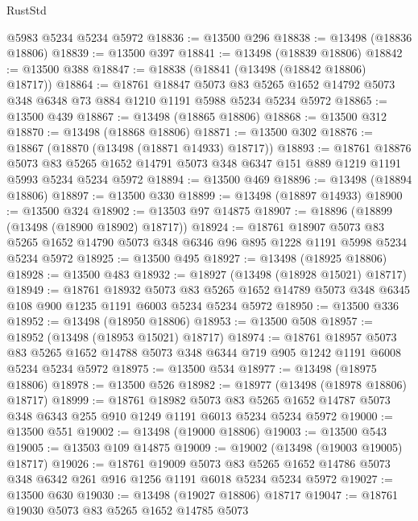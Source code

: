 \begin{lexlean}{RustStd}
\begin{coremodule}
    @5983
    @5234
    @5234
    @5972
@18836 := @13500 @296
@18838 := @13498 (@18836 @18806)
@18839 := @13500 @397
@18841 := @13498 (@18839 @18806)
@18842 := @13500 @388
@18847 := @18838 (@18841 (@13498 (@18842 @18806) @18717))
@18864 := @18761
    @18847
    @5073
    @83
    @5265
    @1652
    @14792
    @5073
    @348
    @6348
    @73
    @884
    @1210
    @1191
    @5988
    @5234
    @5234
    @5972
@18865 := @13500 @439
@18867 := @13498 (@18865 @18806)
@18868 := @13500 @312
@18870 := @13498 (@18868 @18806)
@18871 := @13500 @302
@18876 := @18867 (@18870 (@13498 (@18871 @14933) @18717))
@18893 := @18761
    @18876
    @5073
    @83
    @5265
    @1652
    @14791
    @5073
    @348
    @6347
    @151
    @889
    @1219
    @1191
    @5993
    @5234
    @5234
    @5972
@18894 := @13500 @469
@18896 := @13498 (@18894 @18806)
@18897 := @13500 @330
@18899 := @13498 (@18897 @14933)
@18900 := @13500 @324
@18902 := @13503 @97 @14875
@18907 := @18896 (@18899 (@13498 (@18900 @18902) @18717))
@18924 := @18761
    @18907
    @5073
    @83
    @5265
    @1652
    @14790
    @5073
    @348
    @6346
    @96
    @895
    @1228
    @1191
    @5998
    @5234
    @5234
    @5972
@18925 := @13500 @495
@18927 := @13498 (@18925 @18806)
@18928 := @13500 @483
@18932 := @18927 (@13498 (@18928 @15021) @18717)
@18949 := @18761
    @18932
    @5073
    @83
    @5265
    @1652
    @14789
    @5073
    @348
    @6345
    @108
    @900
    @1235
    @1191
    @6003
    @5234
    @5234
    @5972
@18950 := @13500 @336
@18952 := @13498 (@18950 @18806)
@18953 := @13500 @508
@18957 := @18952 (@13498 (@18953 @15021) @18717)
@18974 := @18761
    @18957
    @5073
    @83
    @5265
    @1652
    @14788
    @5073
    @348
    @6344
    @719
    @905
    @1242
    @1191
    @6008
    @5234
    @5234
    @5972
@18975 := @13500 @534
@18977 := @13498 (@18975 @18806)
@18978 := @13500 @526
@18982 := @18977 (@13498 (@18978 @18806) @18717)
@18999 := @18761
    @18982
    @5073
    @83
    @5265
    @1652
    @14787
    @5073
    @348
    @6343
    @255
    @910
    @1249
    @1191
    @6013
    @5234
    @5234
    @5972
@19000 := @13500 @551
@19002 := @13498 (@19000 @18806)
@19003 := @13500 @543
@19005 := @13503 @109 @14875
@19009 := @19002 (@13498 (@19003 @19005) @18717)
@19026 := @18761
    @19009
    @5073
    @83
    @5265
    @1652
    @14786
    @5073
    @348
    @6342
    @261
    @916
    @1256
    @1191
    @6018
    @5234
    @5234
    @5972
@19027 := @13500 @630
@19030 := @13498 (@19027 @18806) @18717
@19047 := @18761
    @19030
    @5073
    @83
    @5265
    @1652
    @14785
    @5073

\end{coremodule}
\end{lexlean}

